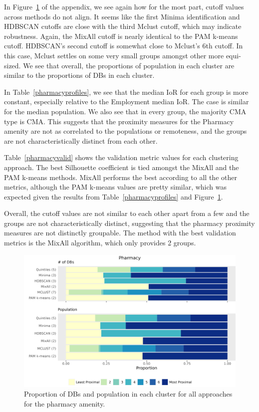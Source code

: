 \documentclass[11pt, a4paper]{article}
\begin{document}
In Figure~\ref{pharmacybarplot} of the appendix, we see again how for the most part, cutoff values across methods do not align. It seems like the first Minima identification and HDBSCAN cutoffs are close with the third Mclust cutoff, which may indicate robustness. Again, the MixAll cutoff is nearly identical to the PAM k-means cutoff. HDBSCAN’s second cutoff is somewhat close to Mclust’s 6th cutoff. In this case, Mclust settles on some very small groups amongst other more equi-sized. We see that overall, the proportions of population in each cluster are similar to the proportions of DBs in each cluster.
\par
In Table~\ref{pharmacyprofiles}, we see that the median IoR for each group is more constant, especially relative to the Employment median IoR. The case is similar for the median population. We also see that in every group, the majority CMA type is CMA. This suggests that the proximity measures for the Pharmacy amenity are not as correlated to the populations or remoteness, and the groups are not characteristically distinct from each other.
\par
Table~\ref{pharmacyvalid} shows the validation metric values for each clustering approach. The best Silhouette coefficient is tied amongst the MixAll and the PAM k-means methods. MixAll performs the best according to all the other metrics, although the PAM k-means values are pretty similar, which was expected given the results from Table~\ref{pharmacyprofiles} and Figure~\ref{pharmacybarplot}.
\par
Overall, the cutoff values are not similar to each other apart from a few and the groups are not characteristically distinct, suggesting that the pharmacy proximity measures are not distinctly groupable. The method with the best validation metrics is the MixAll algorithm, which only provides 2 groups.





\begin{figure}[H]
\centering
\includegraphics[width=\textwidth]{./barplot_comparison/Pharmacy_barplot.png}
\caption[Pharmacy profile barplot]{Proportion of DBs and population in each cluster for all approaches for the pharmacy amenity.}\label{pharmacybarplot}
\end{figure}
\end{document}
